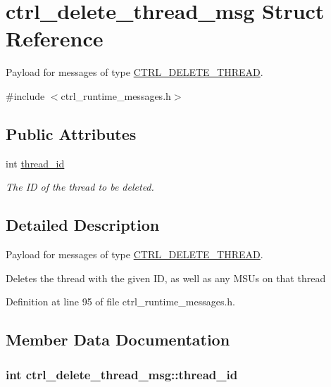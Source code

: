 \hypertarget{structctrl__delete__thread__msg}{\section{ctrl\-\_\-delete\-\_\-thread\-\_\-msg Struct Reference}
\label{structctrl__delete__thread__msg}
}


Payload for messages of type \hyperlink{ctrl__runtime__messages_8h_aff250b7918a6975b13277c84bc6ec5b9a3c0e4be670ba69db1375758d3c8a4f33}{C\-T\-R\-L\-\_\-\-D\-E\-L\-E\-T\-E\-\_\-\-T\-H\-R\-E\-A\-D}.  




{\ttfamily \#include $<$ctrl\-\_\-runtime\-\_\-messages.\-h$>$}

\subsection*{Public Attributes}
\begin{DoxyCompactItemize}
\item 
int \hyperlink{structctrl__delete__thread__msg_ad841782f8371b4fb3cb72e8c02fc1366}{thread\-\_\-id}
\begin{DoxyCompactList}\small\item\em The I\-D of the thread to be deleted. \end{DoxyCompactList}\end{DoxyCompactItemize}


\subsection{Detailed Description}
Payload for messages of type \hyperlink{ctrl__runtime__messages_8h_aff250b7918a6975b13277c84bc6ec5b9a3c0e4be670ba69db1375758d3c8a4f33}{C\-T\-R\-L\-\_\-\-D\-E\-L\-E\-T\-E\-\_\-\-T\-H\-R\-E\-A\-D}. 

Deletes the thread with the given I\-D, as well as any M\-S\-Us on that thread 

Definition at line 95 of file ctrl\-\_\-runtime\-\_\-messages.\-h.



\subsection{Member Data Documentation}
\hypertarget{structctrl__delete__thread__msg_ad841782f8371b4fb3cb72e8c02fc1366}{
\subsubsection[{thread\-\_\-id}]{\setlength{\rightskip}{0pt plus 5cm}int ctrl\-\_\-delete\-\_\-thread\-\_\-msg\-::thread\-\_\-id}}\label{structctrl__delete__thread__msg_ad841782f8371b4fb3cb72e8c02fc1366}


